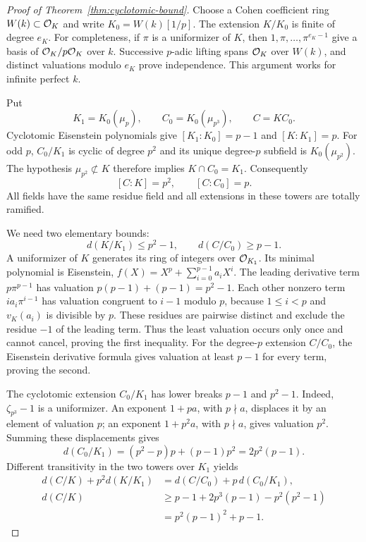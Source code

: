 \begin{proof}[Proof of Theorem~\ref{thm:cyclotomic-bound}]
Choose a Cohen coefficient ring $W(k)\subset\mathcal O_K$ and write $K_0=W(k)[1/p]$. The extension $K/K_0$ is finite of degree $e_K$. For completeness, if $\pi$ is a uniformizer of $K$, then $1,\pi,\ldots,\pi^{e_K-1}$ give a basis of $\mathcal O_K/p\mathcal O_K$ over $k$. Successive $p$-adic lifting spans $\mathcal O_K$ over $W(k)$, and distinct valuations modulo $e_K$ prove independence. This argument works for infinite perfect $k$.

Put
\[
 K_1=K_0(\mu_p),\qquad C_0=K_0(\mu_{p^3}),\qquad C=KC_0.
\]
Cyclotomic Eisenstein polynomials give $[K_1:K_0]=p-1$ and $[K:K_1]=p$. For odd $p$, $C_0/K_1$ is cyclic of degree $p^2$ and its unique degree-$p$ subfield is $K_0(\mu_{p^2})$. The hypothesis $\mu_{p^2}\not\subset K$ therefore implies $K\cap C_0=K_1$. Consequently
\[
 [C:K]=p^2,\qquad[C:C_0]=p.
\]
All fields have the same residue field and all extensions in these towers are totally ramified.

We need two elementary bounds:
\begin{equation}\label{eq:different-bounds}
 d(K/K_1)\le p^2-1,
 \qquad d(C/C_0)\ge p-1.
\end{equation}
A uniformizer of $K$ generates its ring of integers over $\mathcal O_{K_1}$. Its minimal polynomial is Eisenstein,
$f(X)=X^p+\sum_{i=0}^{p-1}a_iX^i$.
The leading derivative term $p\pi^{p-1}$ has valuation $p(p-1)+(p-1)=p^2-1$. Each other nonzero term $ia_i\pi^{i-1}$ has valuation congruent to $i-1$ modulo $p$, because $1\le i<p$ and $v_K(a_i)$ is divisible by $p$. These residues are pairwise distinct and exclude the residue $-1$ of the leading term. Thus the least valuation occurs only once and cannot cancel, proving the first inequality. For the degree-$p$ extension $C/C_0$, the Eisenstein derivative formula gives valuation at least $p-1$ for every term, proving the second.

The cyclotomic extension $C_0/K_1$ has lower breaks $p-1$ and $p^2-1$. Indeed, $\zeta_{p^3}-1$ is a uniformizer. An exponent $1+pa$, with $p\nmid a$, displaces it by an element of valuation $p$; an exponent $1+p^2a$, with $p\nmid a$, gives valuation $p^2$. Summing these displacements gives
\[
 d(C_0/K_1)=(p^2-p)p+(p-1)p^2=2p^2(p-1).
\]
Different transitivity in the two towers over $K_1$ yields
\begin{align*}
 d(C/K)+p^2d(K/K_1)
 &=d(C/C_0)+p\,d(C_0/K_1),\\
 d(C/K)&\ge p-1+2p^3(p-1)-p^2(p^2-1)\\
 &=p^2(p-1)^2+p-1.
\end{align*}


\end{proof}
